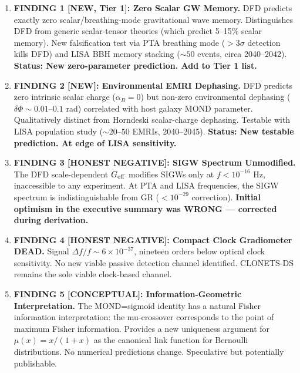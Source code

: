 \documentclass[11pt]{article}
\newcommand{\ee}[1]{\times 10^{#1}}
\newcommand{\mufd}{\mu}
\newcommand{\Geff}{G_{\rm eff}}
\begin{document}
\begin{tcolorbox}[colback=green!5!white, colframe=green!60!black,
  title=\textbf{CORRECTED W4i13 TOP 5 FINDINGS}]

\begin{enumerate}

\item \textbf{FINDING 1 [NEW, Tier 1]: Zero Scalar GW Memory.}
  DFD predicts exactly zero scalar/breathing-mode gravitational wave
  memory. Distinguishes DFD from generic scalar-tensor theories
  (which predict 5--15\% scalar memory). New falsification test via
  PTA breathing mode ($>3\sigma$ detection kills DFD) and LISA BBH
  memory stacking ($\sim 50$ events, circa 2040--2042).
  \textbf{Status: New zero-parameter prediction. Add to Tier 1 list.}

\item \textbf{FINDING 2 [NEW]: Environmental EMRI Dephasing.}
  DFD predicts zero intrinsic scalar charge ($\alpha_B = 0$) but
  non-zero environmental dephasing ($\delta\Phi \sim 0.01$--$0.1$ rad)
  correlated with host galaxy MOND parameter. Qualitatively distinct
  from Horndeski scalar-charge dephasing. Testable with LISA population
  study ($\sim 20$--$50$ EMRIs, 2040--2045).
  \textbf{Status: New testable prediction. At edge of LISA sensitivity.}

\item \textbf{FINDING 3 [HONEST NEGATIVE]: SIGW Spectrum Unmodified.}
  The DFD scale-dependent $\Geff$ modifies SIGWs only at
  $f < 10^{-16}$ Hz, inaccessible to any experiment. At PTA and LISA
  frequencies, the SIGW spectrum is indistinguishable from GR
  ($< 10^{-29}$ correction). \textbf{Initial optimism in the executive
  summary was WRONG --- corrected during derivation.}

\item \textbf{FINDING 4 [HONEST NEGATIVE]: Compact Clock Gradiometer DEAD.}
  Signal $\Delta f/f \sim 6\ee{-37}$, nineteen orders below optical
  clock sensitivity. No new viable passive detection channel identified.
  CLONETS-DS remains the sole viable clock-based channel.

\item \textbf{FINDING 5 [CONCEPTUAL]: Information-Geometric Interpretation.}
  The MOND=sigmoid identity has a natural Fisher information
  interpretation: the mu-crossover corresponds to the point of
  maximum Fisher information. Provides a new uniqueness argument
  for $\mufd(x) = x/(1+x)$ as the canonical link function for
  Bernoulli distributions. No numerical predictions change. Speculative
  but potentially publishable.

\end{enumerate}
\end{tcolorbox}
\end{document}
